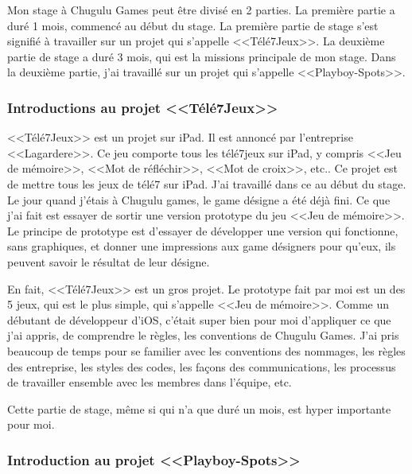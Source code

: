 Mon stage à Chugulu Games peut être divisé en 2 parties. La première partie a duré 1 mois, commencé au début du stage. La première partie de stage s'est signifié à travailler sur un projet qui s'appelle <<Télé7Jeux>>. La deuxième partie de stage a duré 3 mois, qui est la missions principale de mon stage. Dans la deuxième partie, j'ai travaillé sur un projet qui s'appelle <<Playboy-Spots>>.

\subsubsection{Introductions au projet <<Télé7Jeux>>} %
\label{ssub:introductions_au_projet_télé7jeux}


<<Télé7Jeux>> est un projet sur iPad. Il est annoncé par l'entreprise <<Lagardere>>. Ce jeu comporte tous les télé7jeux sur iPad, y compris <<Jeu de mémoire>>, <<Mot de réfléchir>>, <<Mot de croix>>, etc.. Ce projet est de mettre tous les jeux de télé7 sur iPad.
J'ai travaillé dans ce au début du stage. Le jour quand j'étais à Chugulu games, le game désigne a été déjà fini. Ce que j'ai fait est essayer de sortir une version prototype du jeu <<Jeu de mémoire>>. Le principe de prototype est d'essayer de développer une version qui fonctionne, sans graphiques, et donner une impressions aux game désigners pour qu'eux, ils peuvent savoir le résultat de leur désigne. 

En fait, <<Télé7Jeux>> est un gros projet. Le prototype fait par moi est un des 5 jeux, qui est le plus simple, qui s'appelle <<Jeu de mémoire>>. Comme un débutant de développeur d'iOS, c'était super bien pour moi d'appliquer ce que j'ai appris, de comprendre le règles, les conventions de Chugulu Games. J'ai pris beaucoup de temps pour se familier avec les conventions des nommages, les règles des entreprise, les styles des codes, les façons des communications, les processus de travailler ensemble avec les membres dans l'équipe, etc. 

Cette partie de stage, même si qui n'a que duré un mois, est hyper importante pour moi.


\subsubsection{Introduction au projet <<Playboy-Spots>>} %
\label{ssub:introduction_au_projet_playboy_s}

